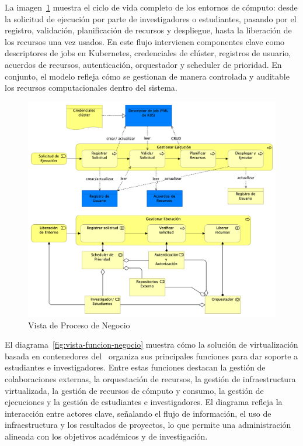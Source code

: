 \noindent
La imagen~\ref{fig:vista-proceso-negocio} muestra el ciclo de vida completo de los entornos de cómputo: desde la solicitud de ejecución por parte de investigadores o estudiantes, pasando por el registro, validación, planificación de recursos y despliegue, hasta la liberación de los recursos una vez usados. En este flujo intervienen componentes clave como descriptores de jobs en Kubernetes, credenciales de clúster, registros de usuario, acuerdos de recursos, autenticación, orquestador y scheduler de prioridad. En conjunto, el modelo refleja cómo se gestionan de manera controlada y auditable los recursos computacionales dentro del sistema.
\begin{figure}[H]
    \centering
    \includegraphics[width=\textwidth]{tablas-images/cp6/Business-Process-View.png}
    \caption{Vista de Proceso de Negocio}\label{fig:vista-proceso-negocio}
\end{figure}
\noindent
El diagrama~\ref{fig:vista-funcion-negocio} muestra cómo la solución de virtualización basada en contenedores del \GRID\ organiza sus principales funciones para dar soporte a estudiantes e investigadores. Entre estas funciones destacan la gestión de colaboraciones externas, la orquestación de recursos, la gestión de infraestructura virtualizada, la gestión de recursos de cómputo y consumo, la gestión de ejecuciones y la gestión de estudiantes e investigadores. El diagrama refleja la interacción entre actores clave, señalando el flujo de información, el uso de infraestructura y los resultados de proyectos, lo que permite una administración alineada con los objetivos académicos y de investigación.

